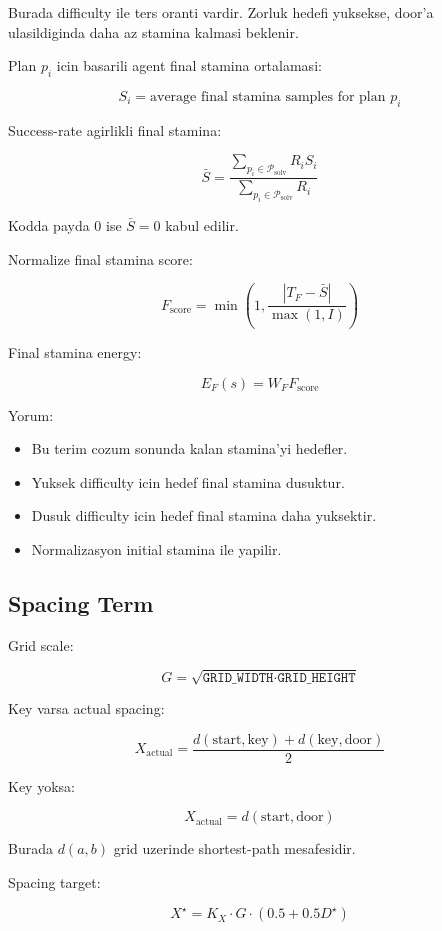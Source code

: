 \documentclass[11pt]{article}
\begin{document}
Burada difficulty ile ters oranti vardir.
Zorluk hedefi yuksekse, door'a ulasildiginda daha az stamina kalmasi beklenir.

Plan $p_i$ icin basarili agent final stamina ortalamasi:

\[
S_i
=
\text{average final stamina samples for plan } p_i
\]

Success-rate agirlikli final stamina:

\[
\bar{S}
=
\frac{
  \sum_{p_i \in \mathcal{P}_{\text{solv}}}
  R_i S_i
}{
  \sum_{p_i \in \mathcal{P}_{\text{solv}}}
  R_i
}
\]

Kodda payda $0$ ise $\bar{S}=0$ kabul edilir.

Normalize final stamina score:

\[
F_{\text{score}}
=
\min
\left(
1,
\frac{
  |T_F - \bar{S}|
}{
  \max(1, I)
}
\right)
\]

Final stamina energy:

\[
E_F(s)
=
W_F F_{\text{score}}
\]

Yorum:

\begin{itemize}
  \item Bu terim cozum sonunda kalan stamina'yi hedefler.
  \item Yuksek difficulty icin hedef final stamina dusuktur.
  \item Dusuk difficulty icin hedef final stamina daha yuksektir.
  \item Normalizasyon initial stamina ile yapilir.
\end{itemize}

\subsection{Spacing Term}

Grid scale:

\[
G
=
\sqrt{\texttt{GRID\_WIDTH} \cdot \texttt{GRID\_HEIGHT}}
\]

Key varsa actual spacing:

\[
X_{\text{actual}}
=
\frac{
  d(\text{start}, \text{key})
  +
  d(\text{key}, \text{door})
}{2}
\]

Key yoksa:

\[
X_{\text{actual}}
=
d(\text{start}, \text{door})
\]

Burada $d(a,b)$ grid uzerinde shortest-path mesafesidir.

Spacing target:

\[
X^\star
=
K_X
\cdot
G
\cdot
(0.5 + 0.5D^\star)
\]
\end{document}
